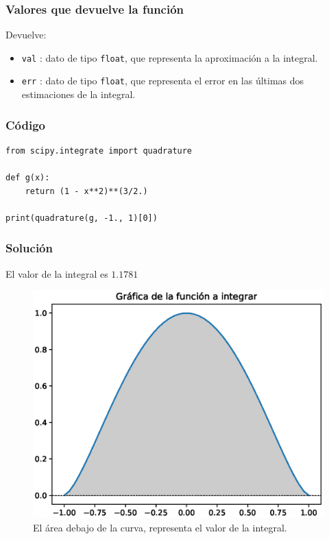 \begin{frame}
\frametitle{Valores que devuelve la función}
Devuelve:
\begin{itemize}
\item \texttt{val} : dato de tipo \texttt{float}, que representa la aproximación a la integral.
\item \texttt{err} : dato de tipo \texttt{float}, que representa el error en las últimas dos estimaciones de la integral.
\end{itemize}
\end{frame}
\begin{frame}[fragile]
\frametitle{Código}
\begin{lstlisting}[caption=Código para cuadratura gaussiana, style=FormattedNumber, basicstyle=\linespread{1.1}\ttfamily=\small, columns=fullflexible]
from scipy.integrate import quadrature

def g(x):
    return (1 - x**2)**(3/2.)

print(quadrature(g, -1., 1)[0])
\end{lstlisting}
\end{frame}
\begin{frame}
\frametitle{Solución}
El valor de la integral es $1.1781$
\begin{figure}
	\centering
	\includegraphics[scale=0.5]{Imagenes/cuadratura_01.eps}
	\caption{El área debajo de la curva, representa el valor de la integral.}
\end{figure}
\end{frame}


